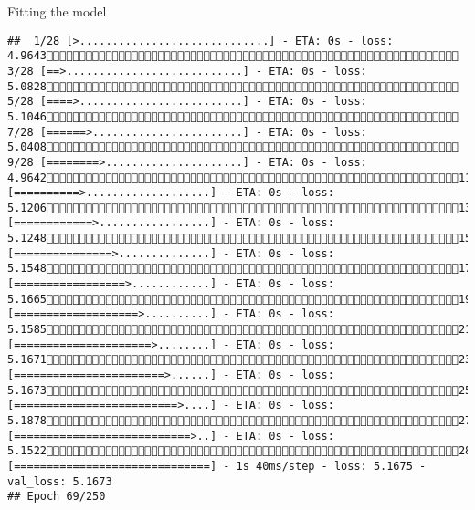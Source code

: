 \documentclass[
  ignorenonframetext,
]{beamer}
\begin{document}
\begin{frame}[fragile]{Fitting the model}
\begin{verbatim}
##  1/28 [>.............................] - ETA: 0s - loss: 4.9643 3/28 [==>...........................] - ETA: 0s - loss: 5.0828 5/28 [====>.........................] - ETA: 0s - loss: 5.1046 7/28 [======>.......................] - ETA: 0s - loss: 5.0408 9/28 [========>.....................] - ETA: 0s - loss: 4.964211/28 [==========>...................] - ETA: 0s - loss: 5.120613/28 [============>.................] - ETA: 0s - loss: 5.124815/28 [===============>..............] - ETA: 0s - loss: 5.154817/28 [=================>............] - ETA: 0s - loss: 5.166519/28 [===================>..........] - ETA: 0s - loss: 5.158521/28 [=====================>........] - ETA: 0s - loss: 5.167123/28 [=======================>......] - ETA: 0s - loss: 5.167325/28 [=========================>....] - ETA: 0s - loss: 5.187827/28 [===========================>..] - ETA: 0s - loss: 5.152228/28 [==============================] - 1s 40ms/step - loss: 5.1675 - val_loss: 5.1673
## Epoch 69/250

\end{verbatim}
\end{frame}
\end{document}
